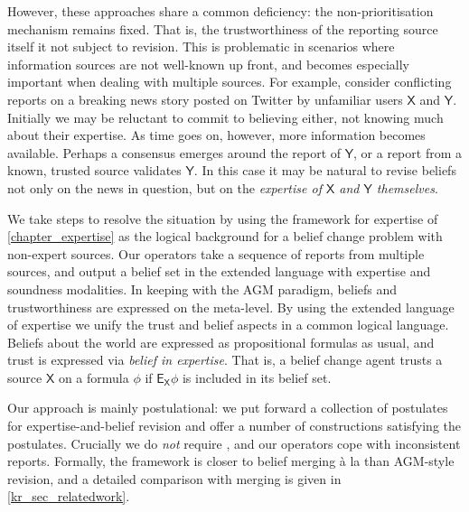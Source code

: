 {However, these approaches share a common deficiency: the non-prioritisation
mechanism remains fixed. That is, the trustworthiness of the reporting source
itself it not subject to revision. This is problematic in scenarios where
information sources are not well-known up front, and becomes especially
important when dealing with multiple sources. For example, consider conflicting
reports on a breaking news story posted on Twitter by unfamiliar users
$\mathsf{X}$ and $\mathsf{Y}$.  Initially we may be reluctant to commit to
believing either, not knowing much about their expertise. As time goes on,
however, more information becomes available. Perhaps a consensus emerges around
the report of $\mathsf{Y}$, or a report from a known, trusted source validates
$\mathsf{Y}$. In this case it may be natural to revise beliefs not only on the
news in question, but on the \emph{expertise of $\mathsf{X}$ and $\mathsf{Y}$
themselves}.

We take steps to resolve the situation by using the framework for expertise of
\cref{chapter_expertise} as the logical background for a belief change problem
with non-expert sources. Our operators take a sequence of reports from multiple
sources, and output a belief set in the extended language with expertise and
soundness modalities. In keeping with the AGM paradigm, beliefs and
trustworthiness are expressed on the meta-level. By using the extended language
of expertise we unify the trust and belief aspects in a common logical
language.\footnotemark{} Beliefs about the world are expressed as propositional
formulas as usual, and trust is expressed via \emph{belief in expertise}. That
is, a belief change agent trusts a source $\mathsf{X}$ on a formula $\phi$ if
$\mathsf{E}_{\mathsf{X}}\phi$ is included in its belief set.


Our approach is mainly postulational: we put forward a collection of postulates
for expertise-and-belief revision and offer a number of constructions satisfying
the postulates. Crucially we do \emph{not} require , and our
operators cope with inconsistent reports. Formally, the framework is closer to
belief merging {\`a} la \textcite{konieczny2002merging} than AGM-style
revision, and a detailed comparison with merging is given in
\cref{kr_sec_relatedwork}.

}
